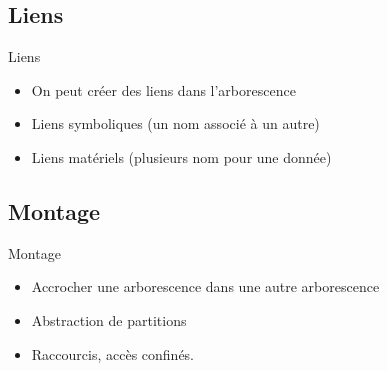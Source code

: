 \subsection{\sectitle}
\begin{frame}{\sectitle}
\def\subsectitle{Liens}
\subsection{\subsectitle}
\begin{block}{\subsectitle}
\begin{itemize}
    \item On peut créer des liens dans l'arborescence
    \item Liens symboliques (un nom associé à un autre)
    \item Liens matériels (plusieurs nom pour une donnée)
\end{itemize}
\end{block}


\def\subsectitle{Montage}
\subsection{\subsectitle}
\begin{block}{\subsectitle}
    \begin{itemize}
        \item Accrocher une arborescence dans une autre arborescence
        \item Abstraction de partitions
        \item Raccourcis, accès confinés.
    \end{itemize}
\end{block}

\end{frame}



